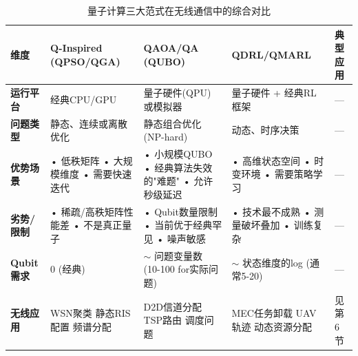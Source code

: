 \documentclass[11pt,a4paper]{article}
\begin{document}
\begin{table}[H]
\centering
\caption{量子计算三大范式在无线通信中的综合对比}
\small
\begin{tabular}{@{}p{2cm}p{3.5cm}p{3.5cm}p{3.5cm}p{2.5cm}@{}}
\toprule
\textbf{维度} & \textbf{Q-Inspired (QPSO/QGA)} & \textbf{QAOA/QA (QUBO)} & \textbf{QDRL/QMARL} & \textbf{典型应用} \\ \midrule

\textbf{运行平台} & 
经典CPU/GPU & 
量子硬件(QPU) 或模拟器 & 
量子硬件 + 经典RL框架 & 
— \\ \midrule

\textbf{问题类型} & 
静态、连续或离散优化 & 
静态组合优化 (NP-hard) & 
动态、时序决策 & 
— \\ \midrule

\textbf{优势场景} & 
• 低秩矩阵 \newline
• 大规模维度 \newline
• 需要快速迭代 & 
• 小规模QUBO \newline
• 经典算法失效的"难题" \newline
• 允许秒级延迟 & 
• 高维状态空间 \newline
• 时变环境 \newline
• 需要策略学习 & 
— \\ \midrule

\textbf{劣势/限制} & 
• 稀疏/高秩矩阵性能差 \newline
• 不是真正量子 & 
• Qubit数量限制 \newline
• 当前优于经典罕见 \newline
• 噪声敏感 & 
• 技术最不成熟 \newline
• 测量破坏叠加 \newline
• 训练复杂 & 
— \\ \midrule

\textbf{Qubit需求} & 
0 (经典) & 
$\sim$ 问题变量数 \newline
(10-100 for实际问题) & 
$\sim$ 状态维度的log \newline
(通常5-20) & 
— \\ \midrule

\textbf{无线应用} & 
WSN聚类 \newline
静态RIS配置 \newline
频谱分配 & 
D2D信道分配 \newline
TSP路由 \newline
调度问题 & 
MEC任务卸载 \newline
UAV轨迹 \newline
动态资源分配 & 
见第6节 \\ \midrule


\end{tabular}
\end{table}
\end{document}
